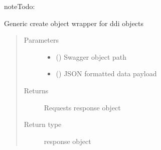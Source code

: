 \documentclass[letterpaper,10pt,english]{sphinxmanual}
\begin{document}
\begin{fulllineitems}
\begin{fulllineitems}
\begin{sphinxadmonition}{note}{\label{\detokenize{b1cdc-class:id1}}Todo:}
\begin{itemize}
\end{itemize}
\end{sphinxadmonition}

\end{fulllineitems}


\begin{fulllineitems}
\label{\detokenize{b1cdc-class:bloxone.b1cdc.replace}}
\sphinxAtStartPar
Generic create object wrapper for ddi objects
\begin{quote}\begin{description}
\item[{Parameters}] \leavevmode\begin{itemize}
\item {} 
\sphinxAtStartPar
{} () \textendash{} Swagger object path

\item {} 
\sphinxAtStartPar
{} () \textendash{} JSON formatted data payload

\end{itemize}

\item[{Returns}] \leavevmode
\sphinxAtStartPar
Requests response object

\item[{Return type}] \leavevmode
\sphinxAtStartPar
response object

\end{description}\end{quote}

\end{fulllineitems}



\end{fulllineitems}
\end{document}
